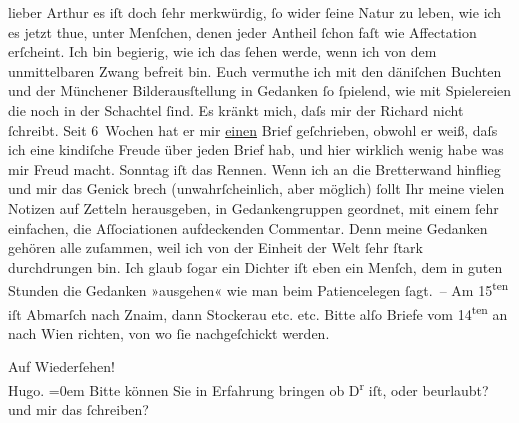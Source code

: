 \pstart{}lieber Arthur\pend\vspace{0.5em}
\pstart
           es iſt doch ſehr merkwürdig, ſo wider ſeine Natur zu leben, wie ich es jetzt thue,
               unter Menſchen, denen jeder Antheil ſchon faſt wie Affectation erſcheint. Ich bin
               begierig, wie ich das ſehen werde, wenn ich von dem unmittelbaren Zwang befreit bin.
               Euch vermuthe ich mit den däniſchen Buchten und
               der Münchener Bilderausſtellung in {\pb}Gedanken ſo ſpielend, wie mit
               Spielereien die noch in der Schachtel ſind. Es kränkt mich, daſs mir der Richard nicht ſchreibt. Seit 6 Wochen hat er
               mir \uline{einen} Brief geſchrieben, obwohl er weiß, daſs ich
               eine kindiſche Freude über jeden Brief hab, und hier wirklich wenig habe was mir
               Freud macht. Sonntag iſt das Rennen. Wenn ich an die Bretterwand hinflieg und mir das
               Genick brech (unwahrſcheinlich, {\pb}aber möglich) ſollt Ihr meine vielen Notizen auf Zetteln herausgeben, in
               Gedankengruppen geordnet, mit einem ſehr einfachen, die Aſſociationen aufdeckenden
               Commentar. Denn meine Gedanken gehören alle zuſammen, weil ich von der Einheit der
               Welt ſehr ſtark durchdrungen bin. Ich glaub ſogar ein Dichter iſt eben ein Menſch,
               dem in guten Stunden die Gedanken »ausgehen« wie man beim Patiencelegen ſagt. – Am
                     15\textsuperscript{ten} iſt Abmarſch {\pb}nach Znaim, dann Stockerau etc. etc. Bitte alſo Briefe vom 14\textsuperscript{ten} an nach Wien richten, von wo ſie
               nachgeſchickt werden.\pend
           
\pstart
           Auf Wiederſehen!{\\[\baselineskip]}\spacefill\mbox{Hugo.}\pend
           \leftskip=0em{}
\pstart
           \noindent{}Bitte können Sie in Erfahrung bringen ob D\textsuperscript{r}{ }\label{K_L00471-1v}\label{K_L00471-1} iſt, oder beurlaubt? und mir das ſchreiben? \pend
           \endnumbering{}  
      